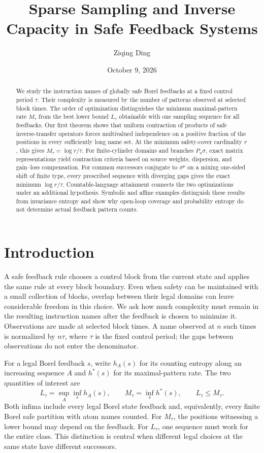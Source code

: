 \documentclass[11pt,reqno]{amsart}
\title[Sparse sampling and inverse capacity]{Sparse Sampling and Inverse Capacity in Safe Feedback Systems}
\author{Ziqing Ding}
\date{October 9, 2026}
\numberwithin{equation}{section}
\theoremstyle{definition}
\begin{document}
\begin{abstract}
We study the instruction names of globally safe Borel feedbacks at a
fixed control period $\tau$. Their complexity is measured by the number
of patterns observed at selected block times. The order of optimization
distinguishes the minimum maximal-pattern rate $M_\tau$ from the best
lower bound $L_\tau$ obtainable with one sampling sequence for all
feedbacks. Our first theorem shows that uniform contraction of products
of safe inverse-transfer operators forces multivalued independence on a
positive fraction of the positions in every sufficiently long name set.
At the minimum safety-cover cardinality $r$, this gives
$M_\tau=\log r/\tau$. For finite-cylinder domains and branches
$P_u\sigma$, exact matrix representations yield contraction criteria
based on source weights, dispersion, and gain--loss compensation.
For common successors conjugate to $\sigma^p$ on a mixing one-sided
shift of finite type, every prescribed sequence with diverging gaps
gives the exact minimum $\log r/\tau$. Countable-language attainment
connects the two optimizations under an additional hypothesis.
Symbolic and affine examples distinguish these
results from invariance entropy and show why open-loop coverage and
probability entropy do not determine actual feedback pattern counts.
\end{abstract}
\maketitle

\section{Introduction}\label{sec:intro}

A safe feedback rule chooses a control block from the current state
and applies the same rule at every block boundary. Even when safety
can be maintained with a small collection of blocks, overlap between
their legal domains can leave considerable freedom in this choice.
We ask how much complexity must remain in the resulting instruction
names after the feedback is chosen to minimize it. Observations are
made at selected block times. A name observed at $n$ such times is
normalized by $n\tau$, where $\tau$ is the fixed control period; the
gaps between observations do not enter the denominator.

For a legal Borel feedback $s$, write $h_A(s)$ for its counting entropy
along an increasing sequence $A$ and $h^*(s)$ for its maximal-pattern
rate. The two quantities of interest are
\[
 L_\tau=\sup_A\inf_s h_A(s),\qquad
 M_\tau=\inf_s h^*(s),\qquad L_\tau\le M_\tau.
\]
Both infima include every legal Borel state feedback and, equivalently,
every finite Borel safe partition with atom names counted. For
$M_\tau$, the positions witnessing a lower bound may depend on the
feedback. For $L_\tau$, one sequence must work for the entire class.
This distinction is central when different legal choices at the same
state have different successors.
\end{document}
